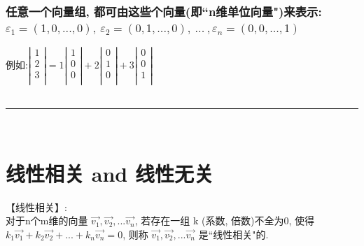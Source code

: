 \documentclass[UTF8]{ctexart}
\begin{document}
\subsubsection{任意一个向量组, 都可由这些个向量(即``n维单位向量")来表示: $\varepsilon _1=\left( 1,0,...,0 \right) ,\ \varepsilon _2=\left( 0,1,...,0 \right) ,\ ...\ ,\varepsilon _n=\left( 0,0,...,1 \right) $}

例如:$
	\left| \begin{array}{c}
		1 \\
		2 \\
		3 \\
	\end{array} \right|=1\left| \begin{array}{c}
		1 \\
		0 \\
		0 \\
	\end{array} \right|+2\left| \begin{array}{c}
		0 \\
		1 \\
		0 \\
	\end{array} \right|+3\left| \begin{array}{c}
		0 \\
		0 \\
		1 \\
	\end{array} \right|
$\\

~\\
\hrule
~\\

\section{线性相关 and  线性无关}

【线性相关】: \\
对于n个m维的向量 $ \vec{v_1},  \vec{v_2}, ...  \vec{v_n}$, 若存在一组 k (系数, 倍数)不全为0, 使得 $ k_1  \vec{v_1} + k_2  \vec{v_2} + ... + k_n  \vec{v_n} = 0 $, 则称 $ \vec{v_1},  \vec{v_2}, ...  \vec{v_n}$ 是``线性相关"的.\\
\end{document}
